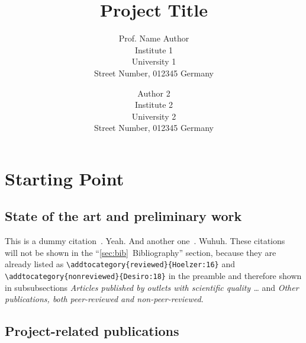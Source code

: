\documentclass[american,firsttime]{dfgproposal}
\title{Project Title}
\author[%
	Prof. Name Author\\
	Institute 1, University 1 (Abbr)
	\and
	Author 2\\
	Institute 2, University 2 (Abbr2)
]{Prof. Name Author\\
	Institute 1\\University 1\\Street Number, 012345 Germany
	\and
	Author 2\\
	Institute 2\\University 2\\Street Number, 012345 Germany
}
\begin{document}
	\maketitle
	
	
	\section{Starting Point}
	\label{sec:work-report}
	
	\subsection{State of the art and preliminary work}
	This is a dummy citation~\cite{Hoelzer:17}. Yeah. And another
	one~\cite{Gerst:18}. Wuhuh. These citations~\cite{Hoelzer:16, Desiro:18} will
	not be shown in the \enquote{\ref{sec:bib}~Bibliography} section, because they are
	already listed as \verb=\addtocategory{reviewed}{Hoelzer:16}= and
	\verb=\addtocategory{nonreviewed}{Desiro:18}= in the preamble and therefore
	shown in subsubsections \emph{Articles published by outlets with scientific
		quality \dots} and \emph{Other publications, both peer-reviewed and non-peer-reviewed}. 
	
	\blindtext[1]
	
	\subsection{Project-related publications}
	
\end{document}
